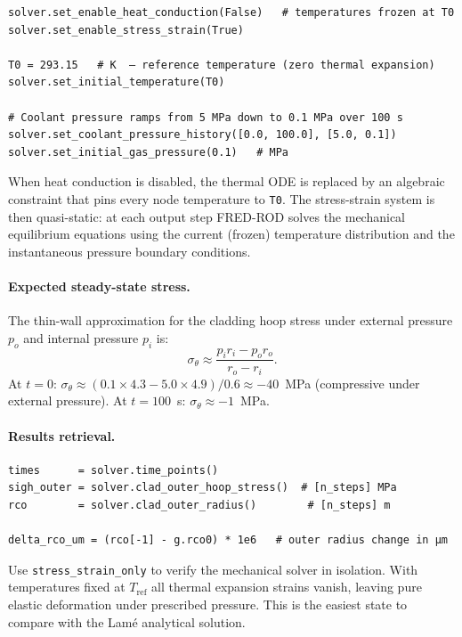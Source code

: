 \documentclass[11pt,a4paper]{article}
\begin{document}
\begin{lstlisting}
solver.set_enable_heat_conduction(False)   # temperatures frozen at T0
solver.set_enable_stress_strain(True)

T0 = 293.15   # K  — reference temperature (zero thermal expansion)
solver.set_initial_temperature(T0)

# Coolant pressure ramps from 5 MPa down to 0.1 MPa over 100 s
solver.set_coolant_pressure_history([0.0, 100.0], [5.0, 0.1])
solver.set_initial_gas_pressure(0.1)   # MPa
\end{lstlisting}

When heat conduction is disabled, the thermal ODE is replaced by an
algebraic constraint that pins every node temperature to
\texttt{T0}.  The stress-strain system is then quasi-static: at each
output step FRED-ROD solves the mechanical equilibrium equations using
the current (frozen) temperature distribution and the instantaneous
pressure boundary conditions.

\paragraph{Expected steady-state stress.}

The thin-wall approximation for the cladding hoop stress under external
pressure $p_o$ and internal pressure $p_i$ is:
\begin{equation}
  \sigma_\theta \approx \frac{p_i r_i - p_o r_o}{r_o - r_i}.
\end{equation}
At $t=0$: $\sigma_\theta \approx (0.1 \times 4.3 - 5.0 \times 4.9)/0.6 \approx -40$~MPa
(compressive under external pressure).  At $t=100$~s: $\sigma_\theta \approx -1$~MPa.

\paragraph{Results retrieval.}

\begin{lstlisting}
times      = solver.time_points()
sigh_outer = solver.clad_outer_hoop_stress()  # [n_steps] MPa
rco        = solver.clad_outer_radius()        # [n_steps] m

delta_rco_um = (rco[-1] - g.rco0) * 1e6   # outer radius change in µm
\end{lstlisting}

\begin{infobox}
  Use \texttt{stress\_strain\_only} to verify the mechanical solver in
  isolation.  With temperatures fixed at $T_\text{ref}$ all thermal expansion
  strains vanish, leaving pure elastic deformation under prescribed pressure.
  This is the easiest state to compare with the Lam\'e analytical solution.
\end{infobox}
\end{document}
